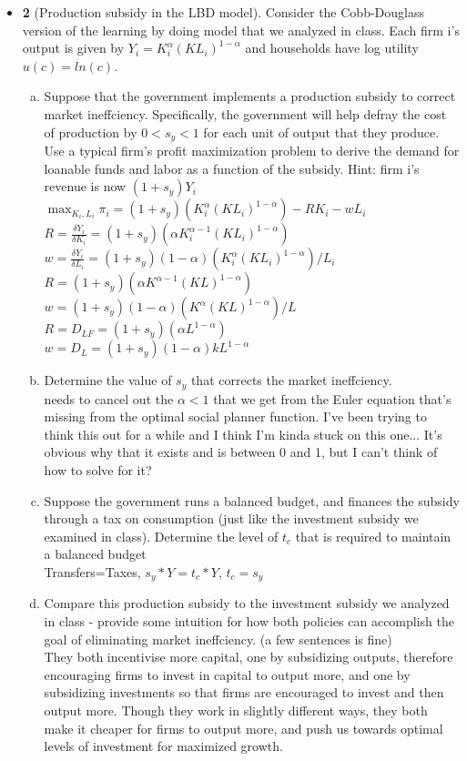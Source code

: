 \documentclass[11pt]{article}
\begin{document}
\begin{itemize}
\newpage

\vspace{0.1in}

\item \textbf{2} 
(Production subsidy in the LBD model). Consider the Cobb-Douglass version of the learning by doing model that we analyzed in class. Each firm i's output is given by $Y_i=K_i^\alpha(KL_i)^{1-\alpha}$ and households have log utility $u(c)=ln(c)$.
\begin{enumerate}[(a)]
\item Suppose that the government implements a production subsidy to correct market ineffciency. Specifically, the government will help defray the cost of production by $0<s_y<1$ for each unit of output that they produce. Use a typical firm's profit maximization problem to derive the demand for loanable funds and labor as a function of the subsidy. Hint: firm i's revenue is now $(1+s_y)Y_i$
\\$\max_{K_i,L_i} \pi_i=(1+s_y)(K_i^\alpha(KL_i)^{1-\alpha})-RK_i-wL_i$
\\$R=\frac{\delta Y_i}{\delta K_i}=(1+s_y)(\alpha K_i^{\alpha-1}(KL_i)^{1-\alpha})$
\\$w=\frac{\delta Y_i}{\delta L_i}=(1+s_y)(1-\alpha)(K_i^\alpha(KL_i)^{1-\alpha})/L_i$
\\$R=(1+s_y)(\alpha K^{\alpha-1}(KL)^{1-\alpha})$
\\$w=(1+s_y)(1-\alpha)(K^\alpha(KL)^{1-\alpha})/L$
\\$R=D_{LF}=(1+s_y)(\alpha L^{1-\alpha})$
\\$w=D_L=(1+s_y)(1-\alpha)kL^{1-\alpha}$
\item Determine the value of $s_y$ that corrects the market ineffciency.
\\needs to cancel out the $\alpha < 1$ that we get from the Euler equation that's missing from the optimal social planner function. I've been trying to think this out for a while and I think I'm kinda stuck on this one... It's obvious why that it exists and is between 0 and 1, but I can't think of how to solve for it?
\item Suppose the government runs a balanced budget, and finances the subsidy through a tax on consumption (just like the investment subsidy we examined in class). Determine the level of $t_c$ that is required to maintain a balanced budget
\\Transfers=Taxes, $s_y*Y=t_c*Y$, $t_c=s_y$
\item Compare this production subsidy to the investment subsidy we analyzed in class - provide some intuition for how both policies can accomplish the goal of eliminating market ineffciency. (a few sentences is fine)
\\They both incentivise more capital, one by subsidizing outputs, therefore encouraging firms to invest in capital to output more, and one by subsidizing investments so that firms are encouraged to invest and then output more. Though they work in slightly different ways, they both make it cheaper for firms to output more, and push us towards optimal levels of investment for maximized growth.
\end{enumerate}

\end{itemize}
\end{document}

